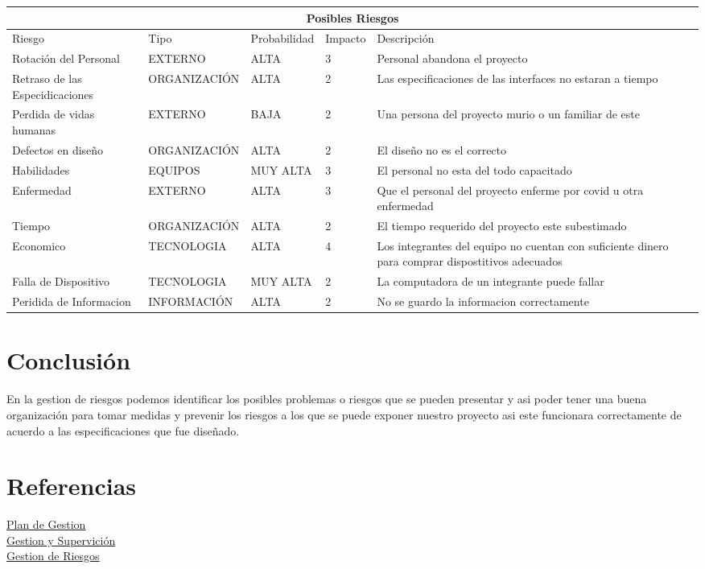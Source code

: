 \documentclass[12pt]{article}
\begin{document}
\begin{tabular}{ |p{2.5cm}||p{3.2cm}|p{2.5cm}|p{1.5cm}||p{3.5cm}|  }
 \hline
 \multicolumn{5}{|c|}{Posibles Riesgos} \\
 \hline
 Riesgo& Tipo & Probabilidad & Impacto & Descripción\\
 \hline
 Rotación del Personal& EXTERNO& ALTA & 3 &Personal abandona el proyecto\\
 Retraso de las Especidicaciones& ORGANIZACIÓN  & ALTA & 2 & Las especificaciones de las interfaces no estaran a tiempo\\
 Perdida de vidas humanas &EXTERNO & BAJA & 2 & Una persona del proyecto murio o un familiar de este\\
 Defectos en diseño & ORGANIZACIÓN &ALTA & 2 & El diseño no es el correcto\\
 Habilidades & EQUIPOS &MUY ALTA & 3 & El personal no esta del todo capacitado\\
 Enfermedad & EXTERNO & ALTA & 3 & Que el personal del proyecto enferme por covid u otra enfermedad\\
 Tiempo & ORGANIZACIÓN & ALTA & 2 & El tiempo requerido del proyecto este subestimado\\
 Economico &TECNOLOGIA & ALTA & 4 & Los integrantes del equipo no cuentan con suficiente dinero para comprar dispostitivos adecuados\\
 Falla de Dispositivo & TECNOLOGIA & MUY ALTA & 2 & La computadora de un integrante puede fallar\\
 Peridida de Informacion & INFORMACIÓN & ALTA & 2& No se guardo la informacion correctamente\\
 \hline
\end{tabular}

\section{Conclusión}
En la gestion de riesgos podemos identificar los posibles problemas o riesgos que se pueden presentar y asi poder tener una buena organización para tomar medidas y prevenir los riesgos a los que se puede exponer nuestro proyecto asi este funcionara correctamente de acuerdo a las especificaciones que fue diseñado.\\


\section{Referencias}
\href{https://issuu.com/xaviernievez/docs/cuarto_docum_-_plan_de_gestion_de_riesgos}{Plan de Gestion}\\
\href{http://www.lsi.us.es/docencia/get.php?id=7133}{Gestion y Supervición}\\
\href{https://ocw.unican.es/pluginfile.php/1408/course/section/1803/tema7-gestionRiesgos.pdf}{Gestion de Riesgos}\\
\end{document}
